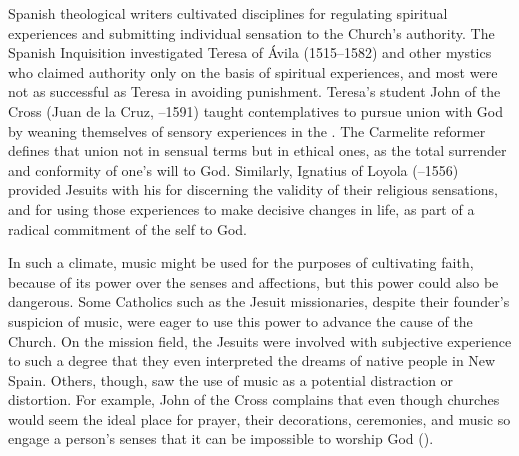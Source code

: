 Spanish theological writers cultivated disciplines for regulating spiritual
experiences and submitting individual sensation to the Church's authority.
The Spanish Inquisition investigated Teresa of Ávila (1515--1582) and other
mystics who claimed authority only on the basis of spiritual experiences, and
most were not as successful as Teresa in avoiding punishment.%
    \Autocites{Ahlgren:TeresaPolitics}{Francisca:Inquisition}
Teresa's student John of the Cross (Juan de la Cruz, --1591) taught
contemplatives to pursue union with God by weaning themselves of sensory
experiences in the .
The Carmelite reformer defines that union not in sensual terms but in ethical
ones, as the total surrender and conformity of one's will to God.%
    \Autocite
    [, , ]
    {JuandelaCruz:Subida} %
Similarly, Ignatius of Loyola (--1556) provided Jesuits with his
 for discerning the validity of their religious
sensations, and for using those experiences to make decisive changes in life, as
part of a radical commitment of the self to God.%
    \Autocite[]{Schreiner:Certainty}

In such a climate, music might be used for the purposes of cultivating faith,
because of its power over the senses and affections, but this power could also
be dangerous.
Some Catholics such as the Jesuit missionaries, despite their founder's
suspicion of music, were eager to use this power to advance the cause of the
Church.
On the mission field, the Jesuits were involved with subjective experience to
such a degree that they even interpreted the dreams of native people in New
Spain.%
    \Autocite[40--41]{Bailey:Art}
Others, though, saw the use of music as a potential distraction or distortion.
For example, John of the Cross complains that even though churches would seem the
ideal place for prayer, their decorations, ceremonies, and music so engage a
person's senses that it can be impossible to worship God  ().%
    \Autocite
    [, , ]
    {JuandelaCruz:Subida}

